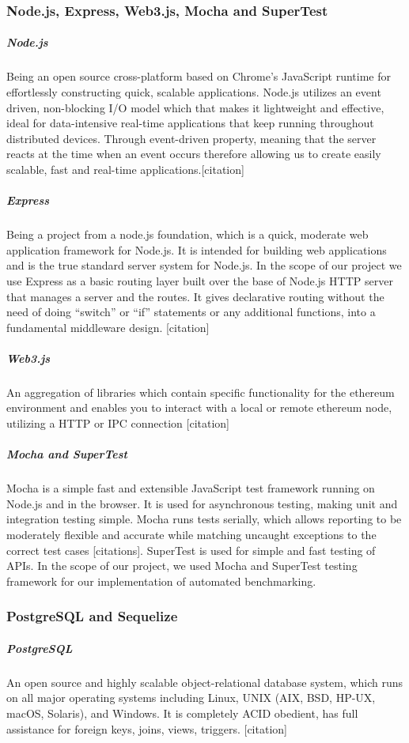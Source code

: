 \subsubsection{Node.js, Express, Web3.js, Mocha and SuperTest}

\subparagraph{Node.js}
Being an open source cross-platform based on Chrome's JavaScript runtime for effortlessly constructing quick, scalable applications. Node.js utilizes an event driven, non-blocking I/O model which that makes it lightweight and effective, ideal for data-intensive real-time applications that keep running throughout distributed devices. Through event-driven property, meaning that the server reacts at the time when an event occurs therefore allowing us to create easily scalable, fast and real-time applications.[citation]

\subparagraph{Express}

Being a project from a node.js foundation, which is a quick, moderate web application framework for Node.js. It is intended for building web applications and is the true standard server system for Node.js. In the scope of our project we use Express as a basic routing layer built over the base of Node.js HTTP server that manages a server and the routes. It gives declarative routing without the need of doing “switch” or “if” statements or any additional functions, into a fundamental middleware design. [citation]

\subparagraph{Web3.js}
An aggregation of libraries which contain specific functionality for the ethereum environment and enables you to interact with a local or remote ethereum node, utilizing a HTTP or IPC connection [citation]

\subparagraph{Mocha and SuperTest}

Mocha is a simple fast and extensible JavaScript test framework running on Node.js and in the browser. It is used for asynchronous testing, making unit and integration testing simple. Mocha runs tests serially, which allows reporting to be moderately flexible and accurate while matching uncaught exceptions to the correct test cases [citations]. SuperTest is used for simple and fast testing of APIs. In the scope of our project, we used Mocha and SuperTest testing framework for our implementation of automated benchmarking.


\subsubsection{PostgreSQL and Sequelize}
\subparagraph{PostgreSQL}
An open source and highly scalable object-relational database system, which runs on all major operating systems including Linux, UNIX (AIX, BSD, HP-UX, macOS, Solaris), and Windows. It is completely ACID obedient, has full assistance for foreign keys, joins, views, triggers. [citation]

